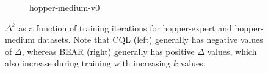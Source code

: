 \begin{figure}
\begin{subfigure}[h]{0.49\linewidth}
      \caption{hopper-medium-v0}
    \end{subfigure}
    \caption{$\Delta^k$ as a function of training iterations for hopper-expert and hopper-medium datasets. Note that CQL (left) generally has negative values of $\Delta$, whereas BEAR (right) generally has positive $\Delta$ values, which also increase during training with increasing $k$ values.}
    \label{fig:delta_plots}
    \vspace{-0.2cm}
\end{figure}

